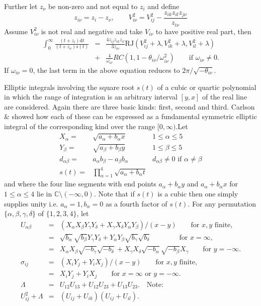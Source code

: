 Further let $z_\nu$ be non-zero and not equal to $z_i$ and define
\[z_{i\nu}=z_i-z_\nu,\qquad V_{i\nu}^2 = V_{ij}^2-\frac{z_{ik}z_{il}z_{j\nu}}{z_{i\nu}} \]
Assume $V_{i\nu}^2$ is not real and negative  and take $V_{i\nu}$ to have positive
real part, then
\begin{eqnarray*}
\int_0^\infty \frac{(t+z_i)\mathrm{d}t}{(t+z_\nu)s(t)} &=&
\frac{4z_{ij}z_{ik}z_{il}}{3z_{i\nu}}\mathrm{RJ}(V_{ij}^2+\lambda, V_{ik}^2+\lambda, V_{il}^2+\lambda) \\
&+&\frac{4}{\omega_{i\nu}}RC(1, 1-\theta_{i\nu}/\omega_{i\nu}^2) \qquad
\mbox{if }\omega_{i\nu} \neq 0.
\end{eqnarray*}
If $\omega_{i\nu}=0$, the last term in the above equation reduces to
$2\pi/\sqrt{-\theta_{i\nu}}$. 


Elliptic integrals involving the square root $s(t)$ of a cubic or quartic
polynomial in which the range of integration is an arbitrary interval $[y,x]$
of the real line are considered. Again there are three basic kinds: first,
second and third. Carlson \cite{Carlson:88} \& \cite{Carlson:99} showed how each
of these can be expressed as a fundamental symmetric elliptic integral of the
corresponding kind over the range $[0,\infty)$.Let
\begin{eqnarray*}
X_\alpha  = & \sqrt{a_\alpha+b_\alpha x} \quad & 1 \leq \alpha \leq 5\\
Y_\beta  = & \sqrt{a_\beta+b_\beta y} \quad & 1 \leq \beta \leq 5\\
d_{\alpha\beta}  = & a_\alpha b_\beta - a_\beta b_\alpha \quad & d_{\alpha\beta} \neq 0\mbox{ if } \alpha \neq \beta\\
s(t)  = &  \prod^4_{\alpha=1} \sqrt{a_\alpha+b_\alpha t}
\end{eqnarray*}
and where the four line segments with end points $a_\alpha+b_\alpha y$ and
$a_\alpha+b_\alpha x$ for $1\leq\alpha\leq 4$ lie in $ \mathbb{C} \setminus (-\infty, 0)$.
Note that if $s(t)$ is a cubic then one simply supplies unity
i.e. $a_\alpha=1, b_\alpha=0$ as a fourth factor of $s(t)$.
For any permutation $\{\alpha,\beta,\gamma,\delta\}$ of $\{1,2,3,4\}$, let
\begin{eqnarray*}
U_{\alpha\beta} &=& (X_\alpha X_\beta Y_\gamma Y_\delta + X_\gamma X_\delta Y_\alpha Y_\beta)
  /(x-y) \qquad \mbox{for } x,y \mbox{ finite},\\
  & = & \sqrt{b_\alpha}\sqrt{b_\beta}Y_\gamma Y_\delta + Y_\alpha Y_\beta
  \sqrt{b_\gamma}\sqrt{b_\delta} \qquad \qquad \mbox{for } x = \infty,\\
  & = & X_\alpha X_\beta \sqrt{-b_\gamma}\sqrt{-b_\delta}+X_\gamma X_\delta
  \sqrt{-b_\alpha}\sqrt{-b_\beta}X_\gamma \qquad \mbox{for } y = -\infty.\\
  \sigma_{ij} &=& (X_iY_j+Y_iX_j)/(x-y)\qquad \mbox{for } x,y \mbox{ finite},\\
  & = & X_iY_j+Y_iX_j \qquad \mbox{for }x =\infty \mbox{ or } y=-\infty.\\
  \Lambda &=& U_{12}U_{13}+U_{12}U_{23}+U_{13}U_{23}.\quad \mbox{Note:} \\
  U_{ij}^2 +\Lambda &=& (U_{ij}+U_{ik})(U_{ij}+U_{il}).
\end{eqnarray*}
